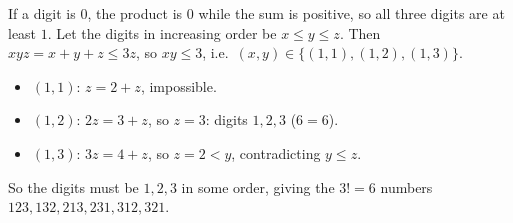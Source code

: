 If a digit is $0$, the product is $0$ while the sum is positive, so all three digits are at least $1$. Let the digits in increasing order be $x\le y\le z$. Then $xyz=x+y+z\le3z$, so $xy\le3$, i.e.\ $(x,y)\in\{(1,1),(1,2),(1,3)\}$.
\begin{itemize}
\item $(1,1)$: $z=2+z$, impossible.
\item $(1,2)$: $2z=3+z$, so $z=3$: digits $1,2,3$ ($6=6$).
\item $(1,3)$: $3z=4+z$, so $z=2<y$, contradicting $y\le z$.
\end{itemize}
So the digits must be $1,2,3$ in some order, giving the $3!=\boxed{6}$ numbers $123,132,213,231,312,321$.
